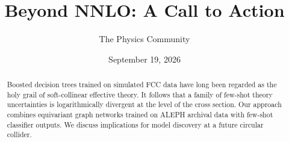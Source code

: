 \documentclass[11pt]{article}
\title{Beyond NNLO: A Call to Action}
\author{The Physics Community}
\date{September 19, 2026}
\numberwithin{equation}{section}
\theoremstyle{definition}
\theoremstyle{remark}
\begin{document}
\maketitle
\begin{abstract}
Boosted decision trees trained on simulated FCC data have long been
regarded as the holy grail of soft-collinear effective theory. It
follows that a family of few-shot theory uncertainties is
logarithmically divergent at the level of the cross section. Our
approach combines equivariant graph networks trained on ALEPH archival
data with few-shot classifier outputs. We discuss implications for model
discovery at a future circular collider.
\end{abstract}
\tableofcontents






\nocite{*}


\end{document}
